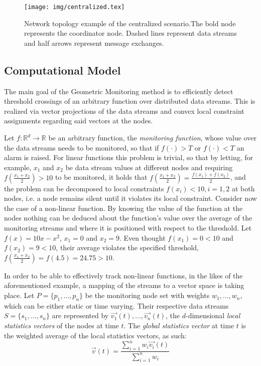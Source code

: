 \begin{figure}[H]
\centering
\texttt{[image: img/centralized.tex]}
\caption{Network topology example of the centralized scenario.The bold node represents the coordinator node. Dashed lines represent data streams and half arrows represent message exchanges.} 
\label{fig:centralized}
\end{figure}

\subsection{Computational Model} \label{subsec:theorBack-GM-compMod}

The main goal of the Geometric Monitoring method is to efficiently detect threshold crossings of an arbitrary function over distributed data streams. This is realized via vector projections of the data streams and convex local constraint assignments regarding said vectors at the nodes.

Let $f:\mathbb{R}^d \to \mathbb{R}$ be an arbitrary function, the \emph{monitoring function}, whose value over the data streams needs to be monitored, so that if $f(\cdot)>T$ or $f(\cdot)<T$ an alarm is raised. For linear functions this problem is trivial, so that by letting, for example, $x_1$ and $x_2$ be data stream values at different nodes and requiring $f(\frac{x_1+x_2}{2})>10$ to be monitored, it holds that $f(\frac{x_1+x_2}{2})=\frac{f(x_1)+f(x_2)}{2}$, and the problem can be decomposed to local constraints $f(x_i)<10, i=1,2$ at both nodes, i.e. a node remains silent until it violates its local constraint. Consider now the case of a non-linear function. By knowing the value of the function at the nodes nothing can be deduced about the function's value over the average of the monitoring streams and where it is positioned with respect to the threshold. Let $f(x)=10x-x^2$, $x_1=0$ and $x_2=9$. Even thought $f(x_1)=0<10$ and $f(x_2)=9<10$, their average violates the specified threshold, $f(\frac{x_1+x_2}{2})=f(4.5)=24.75>10$. 

In order to be able to effectively track non-linear functions, in the likes of the aforementioned example, a mapping of the streams to a vector space is taking place. Let $P=\{p_1, ..., p_n\}$ be the monitoring node set with weights $w_1, ..., w_n$, which can be either static or time varying. Their respective data streams $S=\{s_1, ..., s_n\}$ are represented by $\vec{v_1}(t), ..., \vec{v_n}(t)$, the $d$-dimensional \emph{local statistics vectors} of the nodes at time $t$. The \emph{global statistics vector} at time $t$ is the weighted average of the local statistics vectors, as such:
\begin{equation}
\vec{v}(t)=\frac{\sum_{i=1}^n{w_i\vec{v_i}(t)}}{\sum_{i=1}^n{w_i}}
\label{form:globalStatsVector}
\end{equation}

